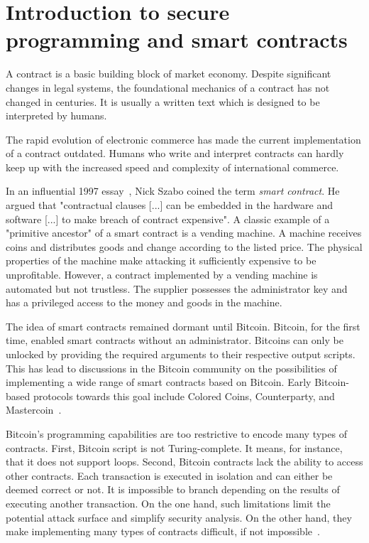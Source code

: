 \chapter{Introduction to secure programming and smart contracts}

\label{Chapter09Introcontracts}

A contract is a basic building block of market economy.
Despite significant changes in legal systems, the foundational mechanics of a contract has not changed in centuries.
It is usually a written text which is designed to be interpreted by humans.

The rapid evolution of electronic commerce has made the current implementation of a contract outdated.
Humans who write and interpret contracts can hardly keep up with the increased speed and complexity of international commerce.

In an influential 1997 essay~\cite{Szabo1997}, Nick Szabo coined the term \textit{smart contract}.
He argued that "contractual clauses [...] can be embedded in the hardware and software [...] to make breach of contract expensive".
A classic example of a "primitive ancestor" of a smart contract is a vending machine.
A machine receives coins and distributes goods and change according to the listed price.
The physical properties of the machine make attacking it sufficiently expensive to be unprofitable.
However, a contract implemented by a vending machine is automated but not trustless.
The supplier possesses the administrator key and has a privileged access to the money and goods in the machine.

The idea of smart contracts remained dormant until Bitcoin.
Bitcoin, for the first time, enabled smart contracts without an administrator.
Bitcoins can only be unlocked by providing the required arguments to their respective output scripts.
This has lead to discussions in the Bitcoin community on the possibilities of implementing a wide range of smart contracts based on Bitcoin.
Early Bitcoin-based protocols towards this goal include Colored Coins, Counterparty, and Mastercoin~\cite{Rosenfeld2012,Willett2016,Bartoletti2017a}.

Bitcoin's programming capabilities are too restrictive to encode many types of contracts.
First, Bitcoin script is not Turing-complete.
It means, for instance, that it does not support loops.
Second, Bitcoin contracts lack the ability to access other contracts.
Each transaction is executed in isolation and can either be deemed correct or not.
It is impossible to branch depending on the results of executing another transaction.
On the one hand, such limitations limit the potential attack surface and simplify security analysis.
On the other hand, they make implementing many types of contracts difficult, if not impossible~\cite{Miller2019}.


